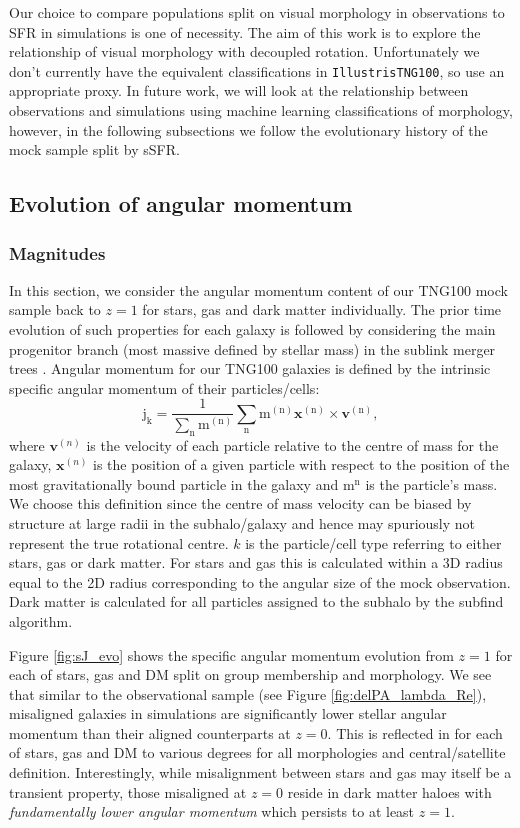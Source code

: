 Our choice to compare populations split on visual morphology in observations to SFR in simulations is one of necessity. The aim of this work is to explore the relationship of visual morphology with decoupled rotation. Unfortunately we don't currently have the equivalent classifications in \texttt{IllustrisTNG100}, so use an appropriate proxy. In future work, we will look at the relationship between observations and simulations using machine learning classifications of morphology, however, in the following subsections we follow the evolutionary history of the mock sample split by sSFR.

\subsection{Evolution of angular momentum} \label{sec:tng_ang_mom_evo}
\subsubsection{Magnitudes}
In this section, we consider the angular momentum content of our TNG100 mock sample back to $z=1$ for stars, gas and dark matter individually. The prior time evolution of such properties for each galaxy is followed by considering the main progenitor branch (most massive defined by stellar mass) in the sublink merger trees \citep{rgomez2015}. Angular momentum for our TNG100 galaxies is defined by the intrinsic specific angular momentum of their particles/cells:
\begin{equation}
\mathrm{j_{k} = \frac{1}{\sum_{n} m^{(n)}} \sum_{n} m^{(n)}\boldsymbol{x}^{(n)} \times \boldsymbol{v}^{(n)}},
\end{equation}
where $\boldsymbol{v}^{(n)}$ is the velocity of each particle relative to the centre of mass for the galaxy, $\boldsymbol{x}^{(n)}$ is the position of a given particle with respect to the position of the most gravitationally bound particle in the galaxy and $\mathrm{m^{n}}$ is the particle's mass. We choose this definition since the centre of mass velocity can be biased by structure at large radii in the subhalo/galaxy and hence may spuriously not represent the true rotational centre. $k$ is the particle/cell type referring to either stars, gas or dark matter. For stars and gas this is calculated within a 3D radius equal to the 2D radius corresponding to the angular size of the mock observation. Dark matter is calculated for all particles assigned to the subhalo by the subfind algorithm. 

Figure \ref{fig:sJ_evo} shows the specific angular momentum evolution from $z=1$ for each of stars, gas and DM split on group membership and morphology. We see that similar to the observational sample (see Figure \ref{fig:delPA_lambda_Re}), misaligned galaxies in simulations are significantly lower stellar angular momentum than their aligned counterparts at $z=0$. This is reflected in for each of stars, gas and DM to various degrees for all morphologies and central/satellite definition. Interestingly, while misalignment between stars and gas may itself be a transient property, those misaligned at $z = 0$ reside in dark matter haloes with \textit{fundamentally lower angular momentum} which persists to at least $z = 1$. 

